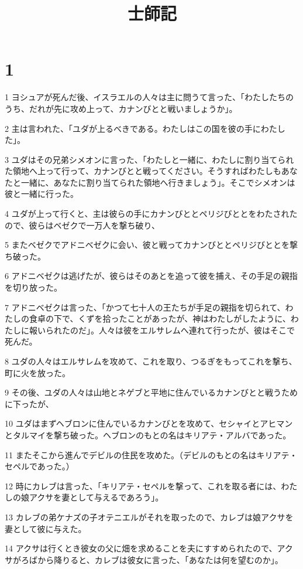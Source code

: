 

\title{士師記}


\chapter{1}

\par 1 ヨシュアが死んだ後、イスラエルの人々は主に問うて言った、「わたしたちのうち、だれが先に攻め上って、カナンびとと戦いましょうか」。
\par 2 主は言われた、「ユダが上るべきである。わたしはこの国を彼の手にわたした」。
\par 3 ユダはその兄弟シメオンに言った、「わたしと一緒に、わたしに割り当てられた領地へ上って行って、カナンびとと戦ってください。そうすればわたしもあなたと一緒に、あなたに割り当てられた領地へ行きましょう」。そこでシメオンは彼と一緒に行った。
\par 4 ユダが上って行くと、主は彼らの手にカナンびととペリジびととをわたされたので、彼らはベゼクで一万人を撃ち破り、
\par 5 またベゼクでアドニベゼクに会い、彼と戦ってカナンびととペリジびととを撃ち破った。
\par 6 アドニベゼクは逃げたが、彼らはそのあとを追って彼を捕え、その手足の親指を切り放った。
\par 7 アドニベゼクは言った、「かつて七十人の王たちが手足の親指を切られて、わたしの食卓の下で、くずを拾ったことがあったが、神はわたしがしたように、わたしに報いられたのだ」。人々は彼をエルサレムへ連れて行ったが、彼はそこで死んだ。
\par 8 ユダの人々はエルサレムを攻めて、これを取り、つるぎをもってこれを撃ち、町に火を放った。
\par 9 その後、ユダの人々は山地とネゲブと平地に住んでいるカナンびとと戦うために下ったが、
\par 10 ユダはまずヘブロンに住んでいるカナンびとを攻めて、セシャイとアヒマンとタルマイを撃ち破った。ヘブロンのもとの名はキリアテ・アルバであった。
\par 11 またそこから進んでデビルの住民を攻めた。（デビルのもとの名はキリアテ・セペルであった。）
\par 12 時にカレブは言った、「キリアテ・セペルを撃って、これを取る者には、わたしの娘アクサを妻として与えるであろう」。
\par 13 カレブの弟ケナズの子オテニエルがそれを取ったので、カレブは娘アクサを妻として彼に与えた。
\par 14 アクサは行くとき彼女の父に畑を求めることを夫にすすめられたので、アクサがろばから降りると、カレブは彼女に言った、「あなたは何を望むのか」。
